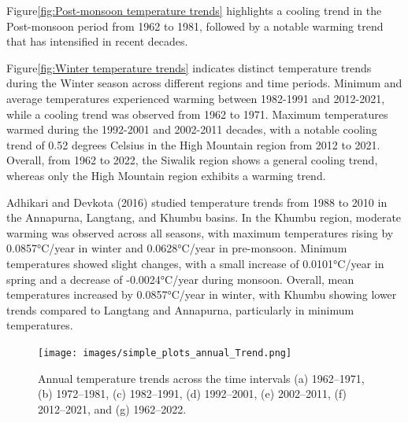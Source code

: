 Figure\ref{fig:Post-monsoon temperature trends} highlights a cooling trend in the Post-monsoon period from 1962 to 1981, followed by a notable warming trend that has intensified in recent decades.

Figure\ref{fig:Winter temperature trends} indicates distinct temperature trends during the Winter season across different regions and time periods. Minimum and average temperatures experienced warming between 1982-1991 and 2012-2021, while a cooling trend was observed from 1962 to 1971. Maximum temperatures warmed during the 1992-2001 and 2002-2011 decades, with a notable cooling trend of 0.52 degrees Celsius in the High Mountain region from 2012 to 2021. Overall, from 1962 to 2022, the Siwalik region shows a general cooling trend, whereas only the High Mountain region exhibits a warming trend.

\citet{adhikari_x_2016}Adhikari and Devkota (2016) studied temperature trends from 1988 to 2010 in the Annapurna, Langtang, and Khumbu basins. In the Khumbu region, moderate warming was observed across all seasons, with maximum temperatures rising by 0.0857°C/year in winter and 0.0628°C/year in pre-monsoon. Minimum temperatures showed slight changes, with a small increase of 0.0101°C/year in spring and a decrease of -0.0024°C/year during monsoon. Overall, mean temperatures increased by 0.0857°C/year in winter, with Khumbu showing lower trends compared to Langtang and Annapurna, particularly in minimum temperatures.

\begin{figure}[H] 
  \centering
  \texttt{[image: images/simple\_plots\_annual\_Trend.png]}  
  \caption{Annual temperature trends across the time intervals (a) 1962–1971, (b) 1972–1981, (c) 1982–1991, (d) 1992–2001, (e) 2002–2011, (f) 2012–2021, and (g) 1962–2022.} 
  \label{fig:Annual temperature trends}  
\end{figure}

